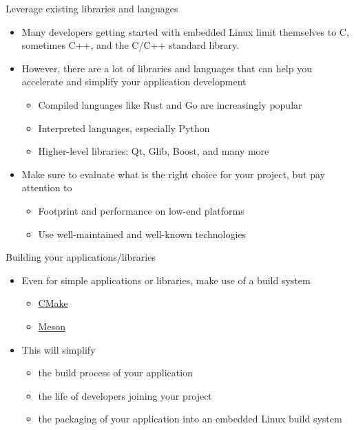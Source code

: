 \begin{frame}{Leverage existing libraries and languages}
  \begin{itemize}
  \item Many developers getting started with embedded Linux limit
    themselves to C, sometimes C++, and the C/C++ standard library.
  \item However, there are a lot of libraries and languages that can
    help you accelerate and simplify your application development
    \begin{itemize}
    \item Compiled languages like Rust and Go are increasingly popular
    \item Interpreted languages, especially Python
    \item Higher-level libraries: Qt, Glib, Boost, and many more
    \end{itemize}
  \item Make sure to evaluate what is the right choice for your
    project, but pay attention to
    \begin{itemize}
    \item Footprint and performance on low-end platforms
    \item Use well-maintained and well-known technologies
    \end{itemize}
  \end{itemize}
\end{frame}

\begin{frame}{Building your applications/libraries}
  \begin{itemize}
  \item Even for simple applications or libraries, make use of a build
    system
    \begin{itemize}
    \item \href{https://cmake.org/}{CMake}
    \item \href{https://mesonbuild.com/}{Meson}
    \end{itemize}
  \item This will simplify
    \begin{itemize}
    \item the build process of your application
    \item the life of developers joining your project
    \item the packaging of your application into an embedded Linux
      build system
    \end{itemize}
  \end{itemize}
\end{frame}

